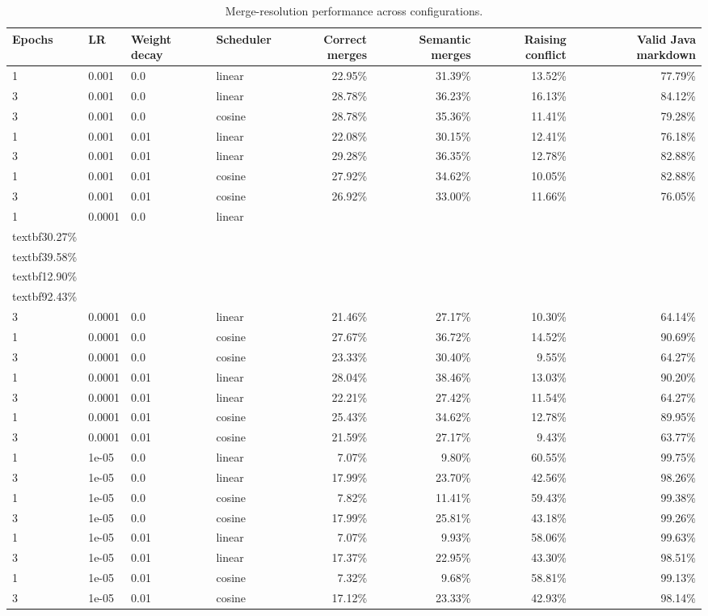\begin{table}[ht]
\centering
\begin{tabular}{l l l l r r r r}
\toprule
Epochs & LR & Weight decay & Scheduler & Correct merges & Semantic merges & Raising conflict & Valid Java markdown \\
\midrule
1 & 0.001 & 0.0 & linear & 22.95\% & 31.39\% & 13.52\% & 77.79\% \\
3 & 0.001 & 0.0 & linear & 28.78\% & 36.23\% & 16.13\% & 84.12\% \\
3 & 0.001 & 0.0 & cosine & 28.78\% & 35.36\% & 11.41\% & 79.28\% \\
1 & 0.001 & 0.01 & linear & 22.08\% & 30.15\% & 12.41\% & 76.18\% \\
3 & 0.001 & 0.01 & linear & 29.28\% & 36.35\% & 12.78\% & 82.88\% \\
1 & 0.001 & 0.01 & cosine & 27.92\% & 34.62\% & 10.05\% & 82.88\% \\
3 & 0.001 & 0.01 & cosine & 26.92\% & 33.00\% & 11.66\% & 76.05\% \\
1 & 0.0001 & 0.0 & linear & \\textbf{30.27}\% & \\textbf{39.58}\% & \\textbf{12.90}\% & \\textbf{92.43}\% \\
3 & 0.0001 & 0.0 & linear & 21.46\% & 27.17\% & 10.30\% & 64.14\% \\
1 & 0.0001 & 0.0 & cosine & 27.67\% & 36.72\% & 14.52\% & 90.69\% \\
3 & 0.0001 & 0.0 & cosine & 23.33\% & 30.40\% & 9.55\% & 64.27\% \\
1 & 0.0001 & 0.01 & linear & 28.04\% & 38.46\% & 13.03\% & 90.20\% \\
3 & 0.0001 & 0.01 & linear & 22.21\% & 27.42\% & 11.54\% & 64.27\% \\
1 & 0.0001 & 0.01 & cosine & 25.43\% & 34.62\% & 12.78\% & 89.95\% \\
3 & 0.0001 & 0.01 & cosine & 21.59\% & 27.17\% & 9.43\% & 63.77\% \\
1 & 1e-05 & 0.0 & linear & 7.07\% & 9.80\% & 60.55\% & 99.75\% \\
3 & 1e-05 & 0.0 & linear & 17.99\% & 23.70\% & 42.56\% & 98.26\% \\
1 & 1e-05 & 0.0 & cosine & 7.82\% & 11.41\% & 59.43\% & 99.38\% \\
3 & 1e-05 & 0.0 & cosine & 17.99\% & 25.81\% & 43.18\% & 99.26\% \\
1 & 1e-05 & 0.01 & linear & 7.07\% & 9.93\% & 58.06\% & 99.63\% \\
3 & 1e-05 & 0.01 & linear & 17.37\% & 22.95\% & 43.30\% & 98.51\% \\
1 & 1e-05 & 0.01 & cosine & 7.32\% & 9.68\% & 58.81\% & 99.13\% \\
3 & 1e-05 & 0.01 & cosine & 17.12\% & 23.33\% & 42.93\% & 98.14\% \\
\bottomrule
\end{tabular}
\caption{Merge-resolution performance across configurations.}
\end{table}
